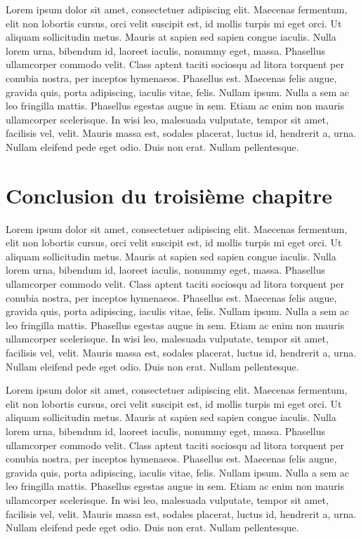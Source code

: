 Lorem ipsum dolor sit amet, consectetuer adipiscing elit. Maecenas
fermentum, elit non lobortis cursus, orci velit suscipit est, id mollis
turpis mi eget orci. Ut aliquam sollicitudin metus. Mauris at sapien sed
sapien congue iaculis. Nulla lorem urna, bibendum id, laoreet iaculis,
nonummy eget, massa. Phasellus ullamcorper commodo velit. Class aptent
taciti sociosqu ad litora torquent per conubia nostra, per inceptos
hymenaeos. Phasellus est. Maecenas felis augue, gravida quis, porta
adipiscing, iaculis vitae, felis. Nullam ipsum. Nulla a sem ac leo
fringilla mattis. Phasellus egestas augue in sem. Etiam ac enim non
mauris ullamcorper scelerisque. In wisi leo, malesuada vulputate, tempor
sit amet, facilisis vel, velit. Mauris massa est, sodales placerat,
luctus id, hendrerit a, urna. Nullam eleifend pede eget odio. Duis non
erat. Nullam pellentesque.

\hypertarget{conclusion-du-troisiuxe8me-chapitre}{%
\section{Conclusion du troisième
chapitre}\label{conclusion-du-troisiuxe8me-chapitre}}

Lorem ipsum dolor sit amet, consectetuer adipiscing elit. Maecenas
fermentum, elit non lobortis cursus, orci velit suscipit est, id mollis
turpis mi eget orci. Ut aliquam sollicitudin metus. Mauris at sapien sed
sapien congue iaculis. Nulla lorem urna, bibendum id, laoreet iaculis,
nonummy eget, massa. Phasellus ullamcorper commodo velit. Class aptent
taciti sociosqu ad litora torquent per conubia nostra, per inceptos
hymenaeos. Phasellus est. Maecenas felis augue, gravida quis, porta
adipiscing, iaculis vitae, felis. Nullam ipsum. Nulla a sem ac leo
fringilla mattis. Phasellus egestas augue in sem. Etiam ac enim non
mauris ullamcorper scelerisque. In wisi leo, malesuada vulputate, tempor
sit amet, facilisis vel, velit. Mauris massa est, sodales placerat,
luctus id, hendrerit a, urna. Nullam eleifend pede eget odio. Duis non
erat. Nullam pellentesque.

Lorem ipsum dolor sit amet, consectetuer adipiscing elit. Maecenas
fermentum, elit non lobortis cursus, orci velit suscipit est, id mollis
turpis mi eget orci. Ut aliquam sollicitudin metus. Mauris at sapien sed
sapien congue iaculis. Nulla lorem urna, bibendum id, laoreet iaculis,
nonummy eget, massa. Phasellus ullamcorper commodo velit. Class aptent
taciti sociosqu ad litora torquent per conubia nostra, per inceptos
hymenaeos. Phasellus est. Maecenas felis augue, gravida quis, porta
adipiscing, iaculis vitae, felis. Nullam ipsum. Nulla a sem ac leo
fringilla mattis. Phasellus egestas augue in sem. Etiam ac enim non
mauris ullamcorper scelerisque. In wisi leo, malesuada vulputate, tempor
sit amet, facilisis vel, velit. Mauris massa est, sodales placerat,
luctus id, hendrerit a, urna. Nullam eleifend pede eget odio. Duis non
erat. Nullam pellentesque.
